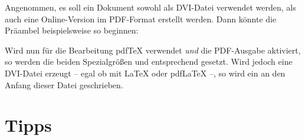\begin{table}
\begin{desctabular}
{      }%
  \end{desctabular}
  \label{tab:typearea.outputdriver}
\end{table}

\begin{Example}
  Angenommen, es soll ein Dokument sowohl als DVI-Datei verwendet
  werden, als auch eine Online-Version im PDF-Format erstellt
  werden. Dann könnte die Präambel beispielsweise so beginnen:
  Wird nun für die Bearbeitung {pdf\TeX} verwendet \emph{und} die
  PDF-Ausgabe aktiviert, so werden die beiden Spezialgrößen
   und  entsprechend gesetzt.
  Wird jedoch eine DVI-Datei erzeugt -- egal ob mit {\LaTeX} oder
  {pdf\LaTeX} --, so wird ein  an den Anfang dieser
  Datei geschrieben.
\end{Example}%
%
\EndIndexGroup
%
\EndIndexGroup

\section{Tipps}

